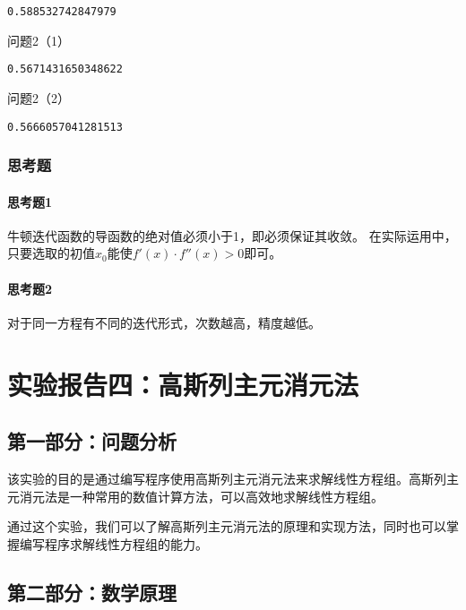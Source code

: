 \documentclass[a4paper,zihao=4,UTF8]{ctexart}
\begin{document}
\begin{lstlisting}
0.588532742847979
\end{lstlisting}

问题2（1）

\begin{lstlisting}
0.5671431650348622
\end{lstlisting}

问题2（2）

\begin{lstlisting}
0.5666057041281513
\end{lstlisting}

\subsubsection*{思考题}

\paragraph*{思考题1}

牛顿迭代函数的导函数的绝对值必须小于1，即必须保证其收敛。
在实际运用中，只要选取的初值$x_0$能使$f'(x)\cdot f''(x)>0$即可。

\paragraph*{思考题2}

对于同一方程有不同的迭代形式，次数越高，精度越低。

\newpage
\section*{ \textbf{实验报告四：高斯列主元消元法}}

\subsection*{第一部分：问题分析}

该实验的目的是通过编写程序使用高斯列主元消元法来求解线性方程组。高斯列主元消元法是一种常用的数值计算方法，可以高效地求解线性方程组。

通过这个实验，我们可以了解高斯列主元消元法的原理和实现方法，同时也可以掌握编写程序求解线性方程组的能力。

\subsection*{第二部分：数学原理}
\end{document}
